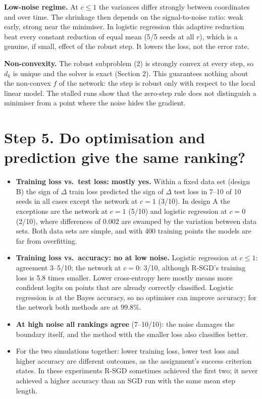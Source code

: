 \documentclass[11pt,a4paper]{article}
\begin{document}
\textbf{Low-noise regime.} At $c\le1$ the variances differ strongly between coordinates and over
time. The shrinkage then depends on the signal-to-noise ratio: weak early, strong near the
minimiser. In logistic regression this adaptive reduction beat every constant reduction of equal
mean (5/5 seeds at all $r$), which is a genuine, if small, effect of the robust step. It lowers
the loss, not the error rate.

\textbf{Non-convexity.} The robust subproblem (2) is strongly convex at every step, so $d_k$
is unique and the solver is exact (Section 2). This guarantees nothing about the non-convex
$f$ of the network: the step is robust only with respect to the local linear model. The stalled
runs show that the zero-step rule does not distinguish a minimiser from a point where the noise
hides the gradient.

\section*{Step 5. Do optimisation and prediction give the same ranking?}

\begin{itemize}
\item \textbf{Training loss vs.\ test loss: mostly yes.} Within a fixed data set (design B) the
sign of $\Delta$ train loss predicted the sign of $\Delta$ test loss in 7--10 of 10 seeds in all
cases except the network at $c=1$ (3/10). In design A the exceptions are the network at $c=1$
(5/10) and logistic regression at $c=0$ (2/10), where differences of $0.002$ are swamped by the
variation between data sets. Both data sets are simple, and with 400 training points the models
are far from overfitting.
\item \textbf{Training loss vs.\ accuracy: no at low noise.} Logistic regression at $c\le1$:
agreement 3--5/10; the network at $c=0$: 3/10, although R-SGD's training loss is 5.8 times
smaller. Lower cross-entropy here mostly means more confident logits on points that are already
correctly classified. Logistic regression is at the Bayes accuracy, so no optimiser can improve
accuracy; for the network both methods are at $99.8\%$.
\item \textbf{At high noise all rankings agree} (7--10/10): the noise damages the boundary
itself, and the method with the smaller loss also classifies better.
\item For the two simulations together: lower training loss, lower test loss and higher
accuracy are different outcomes, as the assignment's success criterion states. In these
experiments R-SGD sometimes achieved the first two; it never achieved a higher accuracy than an
SGD run with the same mean step length.
\end{itemize}
\end{document}
